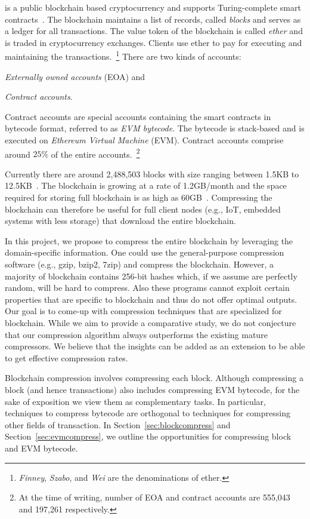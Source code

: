 
\eth{} is a public blockchain based cryptocurrency and supports Turing-complete smart contracts~\cite{ethereum}.
The blockchain maintains a list of records, called \emph{blocks} and serves as a ledger for all transactions.
The value token of the blockchain is called \emph{ether} and 
is traded in cryptocurrency exchanges.
Clients use ether to pay for executing and maintaining the transactions.~\footnote{
\emph{Finney}, \emph{Szabo}, and \emph{Wei} are the denominations of ether.}
There are two kinds of \eth{} accounts: 
\renewcommand\labelenumi{(\theenumi)}
\begin{enumerate*}
	\item \emph{Externally owned accounts} (EOA) and
	\item \emph{Contract accounts}.
\end{enumerate*}
Contract accounts are special accounts containing the smart contracts in bytecode format, referred to as \emph{EVM bytecode}.
The bytecode is stack-based and is executed on \emph{Ethereum Virtual Machine} (EVM).
Contract accounts comprise around $25\%$ of the entire \eth{} accounts.~\footnote{
At the time of writing, number of EOA and contract accounts are 555,043 and 197,261 respectively.}  
 
Currently there are around 2,488,503 blocks with size ranging between 1.5KB to 12.5KB~\cite{ethblocksize}.  
The blockchain is growing at a rate of 1.2GB/month and
the space required for storing full blockchain is as high as 60GB~\cite{ethdiskspace}.
Compressing the blockchain can therefore be useful for full client nodes (e.g., IoT, embedded systems with less storage)
that download the entire blockchain.

In this project, we propose to compress the entire \eth{} blockchain by leveraging the domain-specific information.
One could use the general-purpose compression software (e.g., gzip, bzip2, 7zip) and compress the blockchain.
However, a majority of blockchain contains 256-bit hashes which, if we assume are perfectly random, will be hard to compress.
Also these programs cannot exploit certain properties that are specific to blockchain and thus do not offer optimal outputs.
Our goal is to come-up with compression techniques that  are specialized for blockchain.
While we aim to provide a comparative study, we do not conjecture that our compression algorithm always outperforms the existing mature compressors.
We believe that the insights can be added as an extension to be able to get effective compression rates.   

Blockchain compression involves compressing each block.
Although compressing a block (and hence transactions) also includes compressing EVM bytecode, 
for the sake of exposition we view them as complementary tasks. 
In particular, techniques to compress bytecode are orthogonal to techniques for compressing other fields of transaction.
In Section~\ref{sec:blockcompress} and 
Section~\ref{sec:evmcompress}, we   
outline the opportunities for compressing \eth{} block and EVM bytecode. 


